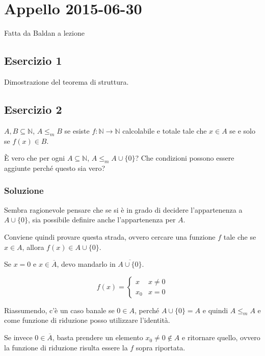 
\section{Appello 2015-06-30 } 

Fatta da Baldan a lezione

\subsection{Esercizio 1}

Dimostrazione del teorema di struttura.

\subsection{Esercizio 2}

$A, B \subseteq \mathbb{N}$, $A \leq_m B$ se esiste $f : \mathbb{N} \rightarrow \mathbb{N}$ calcolabile e totale tale che $x \in A$ se e solo se $f(x) \in B$.

\`{E} vero che per ogni $A \subseteq \mathbb{N}$, $A \leq_m A \cup \{0\}$? Che condizioni possono essere aggiunte perché questo sia vero?

\subsubsection{Soluzione}

Sembra ragionevole pensare che se si è in grado di decidere l'appartenenza a $A \cup \{0\}$, sia possibile definire anche l'appartenenza per $A$.

Conviene quindi provare questa strada, ovvero cercare una funzione $f$ tale che se $x \in A$, allora $f(x) \in A\cup \{0\}$.

Se $x =0$ e $x \in \overline{A}$, devo mandarlo in $\overline{A \cup \{0\} }$.

$$
f(x) = \begin{cases}
x &x \neq 0 \\
x_0 &x = 0
\end{cases}
$$

Riassumendo, c'è un caso banale se $0 \in A$, perché $A \cup \{0\} = A$ e quindi $A \leq_m A$ e come funzione di riduzione posso utilizzare l'identità.

Se invece $0 \in \overline{A}$, basta prendere un elemento $x_0 \neq 0 \notin A$ e ritornare quello, ovvero la funzione di riduzione risulta essere la $f$ sopra riportata.

